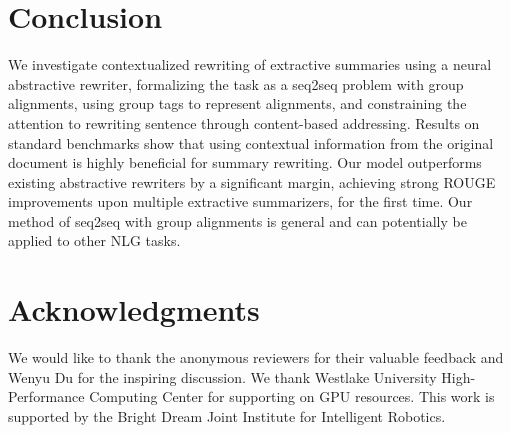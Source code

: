 \documentclass[letterpaper]{article} %
\begin{document}
\section{Conclusion}
We investigate contextualized rewriting of extractive summaries using a neural abstractive rewriter, formalizing the task as a seq2seq problem with group alignments, using group tags to represent alignments, and constraining the attention to rewriting sentence through content-based addressing. Results on standard benchmarks show that using contextual information from the original document is highly beneficial for summary rewriting. Our model outperforms existing abstractive rewriters by a significant margin, achieving strong ROUGE improvements upon multiple extractive summarizers, for the first time. Our method of seq2seq with group alignments is general and can potentially be applied to other NLG tasks.

\section{Acknowledgments}
We would like to thank the anonymous reviewers for their valuable feedback and Wenyu Du for the inspiring discussion. We thank Westlake University High-Performance Computing Center for supporting on GPU resources. This work is supported by the Bright Dream Joint Institute for Intelligent Robotics.


\end{document}
